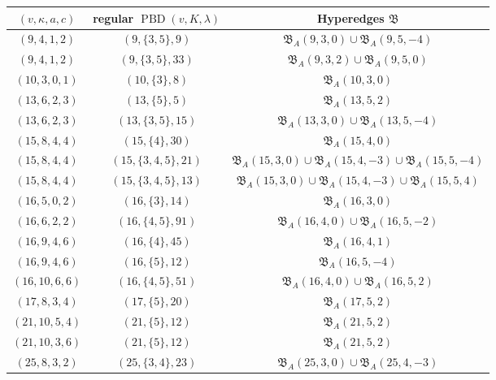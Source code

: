 \documentclass[11pt]{article}
\begin{document}
\begin{table}[htb]
    \centering
    \begin{tabular}{c|c|c}
        $(v,\kappa,a,c)$ & regular $\operatorname{PBD}(v,K,\lambda)$  & Hyperedges $\mathfrak B$ \\
        \hline
        $(9,4,1,2)$ & $(9,\{3,5\},9)$ & $\mathfrak B_A(9,3,0)\cup \mathfrak B_A(9,5,-4)$ \\            
        $(9,4,1,2)$ & $(9,\{3,5\},33)$ & $\mathfrak B_A(9,3,2)\cup \mathfrak B_A(9,5,0)$ \\   
        $(10,3,0,1)$ & $(10,\{3\},8)$ & $\mathfrak B_A(10,3,0)$ \\
        $(13,6,2,3)$ & $(13,\{5\},5)$ & $\mathfrak B_A(13,5,2)$ \\
        $(13,6,2,3)$ & $(13,\{3,5\},15)$ & $\mathfrak B_A(13,3,0)\cup \mathfrak B_A(13,5,-4)$ \\
        $(15,8,4,4)$ & $(15,\{4\},30)$ & $\mathfrak B_A(15,4,0)$ \\
        $(15,8,4,4)$ & $(15,\{3,4,5\},21)$ & $\mathfrak B_A(15,3,0)\cup\mathfrak B_A(15,4,-3)\cup\mathfrak B_A(15,5,-4)$ \\
        $(15,8,4,4)$ & $(15,\{3,4,5\},13)$ & $\mathfrak B_A(15,3,0)\cup\mathfrak B_A(15,4,-3)\cup\mathfrak B_A(15,5,4)$ \\
        $(16,5,0,2)$ & $(16,\{3\},14)$ & $\mathfrak B_A(16,3,0)$ \\
        $(16,6,2,2)$ & $(16,\{4,5\},91)$ & $\mathfrak B_A(16,4,0)\cup \mathfrak B_A(16,5,-2)$ \\
        $(16,9,4,6)$ & $(16,\{4\},45)$ & $\mathfrak B_A(16,4,1)$ \\
        $(16,9,4,6)$ & $(16,\{5\},12)$ & $\mathfrak B_A(16,5,-4)$ \\
        $(16,10,6,6)$ & $(16,\{4,5\},51)$ & $\mathfrak B_A(16,4,0)\cup \mathfrak B_A(16,5,2)$ \\
        $(17,8,3,4)$ & $(17,\{5\},20)$ & $\mathfrak B_A(17,5,2)$ \\
        $(21,10,5,4)$ & $(21,\{5\},12)$ & $\mathfrak B_A(21,5,2)$ \\
        $(21,10,3,6)$ & $(21,\{5\},12)$ & $\mathfrak B_A(21,5,2)$ \\
        $(25,8,3,2)$ & $(25,\{3,4\},23)$ & $\mathfrak B_A(25,3,0)\cup \mathfrak B_A(25,4,-3)$ \\

\end{tabular}
\end{table}
\end{document}
